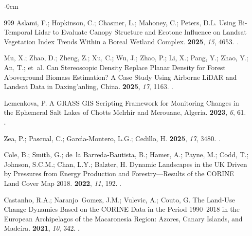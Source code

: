 \documentclass[jimaging,article,accept,pdftex,oneauthor]{Definitions/mdpi}
\begin{document}
\begin{adjustwidth}{-\extralength}{0cm}
\begin{thebibliography}{999}
Aslami, F.; Hopkinson, C.; Chasmer, L.; Mahoney, C.; Peters, D.L.
\newblock Using Bi-Temporal Lidar to Evaluate Canopy Structure and Ecotone
  Influence on Landsat Vegetation Index Trends Within a Boreal Wetland Complex.
 {\bf 2025}, {\em 15}, {4653}.
.

Mu, X.; Zhao, D.; Zheng, Z.; Xu, C.; Wu, J.; Zhao, P.; Li, X.; Pang, Y.; Zhao,
  Y.; An, T.;  et~al.
\newblock Can Stereoscopic Density Replace Planar Density for Forest
  Aboveground Biomass Estimation? A Case Study Using Airborne LiDAR and Landsat
  Data in Daxing'anling, China.
 {\bf 2025}, {\em 17}, {1163}.
.

Lemenkova, P.
\newblock A GRASS GIS Scripting Framework for Monitoring Changes in the
  Ephemeral Salt Lakes of Chotts Melrhir and Merouane, Algeria.
 {\bf 2023}, {\em 6}, {61}.
.

Zea, P.; Pascual, C.; Garc{\'\i}a-Montero, L.G.; Cedillo, H.
\newblock {}
 {\bf 2025}, {\em 17}, {3480}.
.

Cole, B.; Smith, G.; de~la Barreda-Bautista, B.; Hamer, A.; Payne, M.; Codd,
  T.; Johnson, S.C.M.; Chan, L.Y.; Balzter, H.
\newblock Dynamic Landscapes in the UK Driven by Pressures from Energy
  Production and Forestry---Results of the CORINE Land Cover Map 2018.
 {\bf 2022}, {\em 11}, {192}.
.

Castanho, R.A.; Naranjo~Gomez, J.M.; Vulevic, A.; Couto, G.
\newblock The Land-Use Change Dynamics Based on the CORINE Data in the Period
  1990--2018 in the European Archipelagos of the Macaronesia Region: Azores,
  Canary Islands, and Madeira.
 {\bf 2021}, {\em
  10}, {342}.
.


\end{thebibliography}
\end{adjustwidth}
\end{document}
